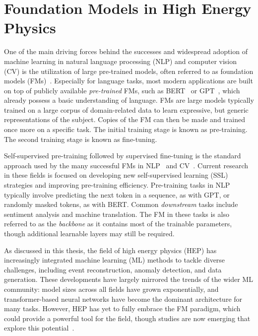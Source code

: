 \chapter{Foundation Models in High Energy Physics}
\label{ch:foundation_models}

One of the main driving forces behind the successes and widespread adoption of machine learning in natural language processing (NLP) and computer vision (CV) is the utilization of large pre-trained models, often referred to as foundation models (FMs)~\cite{OpportunitiesRisksFoundation}.
Especially for language tasks, most modern applications are built on top of publicly available \textit{pre-trained} FMs, such as BERT~\cite{BERT} or GPT~\cite{GPT, GPT2}, which already possess a basic understanding of language.
FMs are large models typically trained on a large corpus of domain-related data to learn expressive, but generic representations of the subject.
Copies of the FM can then be made and trained once more on a specific task.
The initial training stage is known as pre-training.
The second training stage is known as fine-tuning.

Self-supervised pre-training followed by supervised fine-tuning is the standard approach used by the many successful FMs in NLP~\cite{BERT, GPT, GPT2, BART, LanguageModelsAre} and CV~\cite{DINO, Dalle, Flamingo, MAE, BEIT, IJepa}.
Current research in these fields is focused on developing new self-supervised learning (SSL) strategies and improving pre-training efficiency.
Pre-training tasks in NLP typically involve predicting the next token in a sequence, as with GPT, or randomly masked tokens, as with BERT.
Common \textit{downstream} tasks include sentiment analysis and machine translation. The FM in these tasks is also referred to as the \textit{backbone} as it contains most of the trainable parameters, though additional learnable layers may still be required.

As discussed in this thesis, the field of high energy physics (HEP) has increasingly integrated machine learning (ML) methods to tackle diverse challenges, including event reconstruction, anomaly detection, and data generation.
These developments have largely mirrored the trends of the wider ML community: model sizes across all fields have grown exponentially, and transformer-based neural networks have become the dominant architecture for many tasks.
However, HEP has yet to fully embrace the FM paradigm, which could provide a powerful tool for the field, though studies are now emerging that explore this potential~\cite{MPM, MPM2, ReSim, JapanPretrain, Omnijet, Omnilearn, LargeScalePretraining, JetCLR}.

